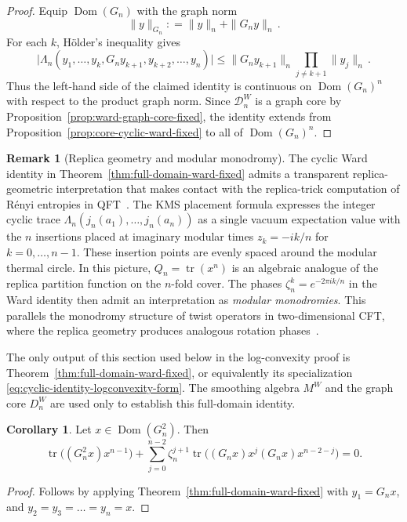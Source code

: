 \documentclass[11pt,a4paper]{article}
\theoremstyle{plain}
\numberwithin{theorem}{section}
\theoremstyle{definition}
\newtheorem{remark}[theorem]{Remark}
\newtheorem{corollary}[theorem]{Corollary}
\newcommand{\?}{\overset{?}{=}}
\newcommand{\defeq}{\mathrel{\mathop:}=}
\DeclareMathOperator{\tr}{tr}
\newcommand{\cD}{\mathcal{D}}
\DeclareMathOperator{\Dom}{Dom}
\begin{document}
\begin{proof}
Equip $\Dom(G_n)$ with the graph norm
\begin{equation*}
  \|y\|_{G_n}\defeq \|y\|_n+\|G_ny\|_n\,.
\end{equation*}
For each $k$, H\"older's inequality gives
\begin{equation*}
  \bigl|
    \Lambda_n(y_1,\ldots,y_k,G_ny_{k+1},y_{k+2},\ldots,y_n)
  \bigr|
  \leq \|G_ny_{k+1}\|_n\prod_{j\neq k+1}\|y_j\|_n\,.
\end{equation*}
Thus the left-hand side of the claimed identity is continuous on $\Dom(G_n)^n$ with respect to the product graph norm.  Since $\cD_n^{W}$ is a graph core by Proposition~\ref{prop:ward-graph-core-fixed}, the identity extends from Proposition~\ref{prop:core-cyclic-ward-fixed} to all of $\Dom(G_n)^n$.
\end{proof}

\begin{remark}[Replica geometry and modular monodromy]
\label{rem:replica-monodromy}
The cyclic Ward identity in Theorem~\ref{thm:full-domain-ward-fixed} admits a transparent replica-geometric interpretation that makes contact with the replica-trick computation of R\'enyi entropies in QFT~\cite{Calabrese:2004eu}.  The KMS placement formula expresses the integer cyclic trace $\Lambda_n(j_n(a_1),\ldots,j_n(a_n))$ as a single vacuum expectation value with the $n$ insertions placed at imaginary modular times $z_k=-ik/n$ for $k=0,\ldots,n-1$.  These insertion points are evenly spaced around the modular thermal circle.  In this picture, $Q_n=\tr(x^n)$ is an algebraic analogue of the replica partition function on the $n$-fold cover. The phases $\zeta_n^k=e^{-2\pi ik/n}$ in the Ward identity then admit an  interpretation as \emph{modular monodromies}. This parallels the monodromy structure of twist operators in two-dimensional CFT, where the replica geometry produces analogous rotation phases~\cite{Calabrese:2004eu}.
\end{remark}

The only output of this section used below in the log-convexity proof is
Theorem~\ref{thm:full-domain-ward-fixed}, or equivalently its
specialization \eqref{eq:cyclic-identity-logconvexity-form}.  The smoothing algebra
\(M^W\) and the graph core \(D_n^W\) are used only to establish this
full-domain identity.
\begin{corollary}
\label{cor:cyclic-identity-logconvexity-form}
Let \(x\in\Dom(G_n^2)\).  Then
\begin{equation}
\label{eq:cyclic-identity-logconvexity-form}
\operatorname{tr}\bigl((G_n^2x)x^{n-1}\bigr)
+
\sum_{j=0}^{n-2}
\zeta_n^{j+1}
\operatorname{tr}\bigl(
(G_nx)x^j(G_nx)x^{n-2-j}
\bigr)
=0.
\end{equation}
\end{corollary}
\begin{proof}
    Follows by applying Theorem~\ref{thm:full-domain-ward-fixed} with $y_1=G_n x$, and $y_2=y_3=\hdots=y_n=x$.
\end{proof}
\end{document}
